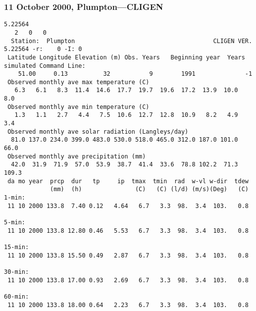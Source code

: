 \subsubsection{11 October 2000, Plumpton---CLIGEN}
\label{sec:PlumptonTemporalScaleSimulationCLIGEN}
\begin{verbatim}
5.22564
   2   0   0
  Station:  Plumpton                                       CLIGEN VER. 5.22564 -r:    0 -I: 0
 Latitude Longitude Elevation (m) Obs. Years   Beginning year  Years simulated Command Line:
    51.00     0.13          32           9        1991              -1
 Observed monthly ave max temperature (C)
   6.3   6.1   8.3  11.4  14.6  17.7  19.7  19.6  17.2  13.9  10.0   8.0
 Observed monthly ave min temperature (C)
   1.3   1.1   2.7   4.4   7.5  10.6  12.7  12.8  10.9   8.2   4.9   3.4
 Observed monthly ave solar radiation (Langleys/day)
  81.0 137.0 234.0 399.0 483.0 530.0 518.0 465.0 312.0 187.0 101.0  66.0
 Observed monthly ave precipitation (mm)
  42.0  31.9  71.9  57.0  53.9  38.7  41.4  33.6  78.8 102.2  71.3 109.3
 da mo year  prcp  dur   tp     ip  tmax  tmin  rad  w-vl w-dir  tdew
             (mm)  (h)               (C)   (C) (l/d) (m/s)(Deg)   (C)
1-min:
 11 10 2000 133.8  7.40 0.12   4.64   6.7   3.3  98.  3.4  103.   0.8

5-min:
 11 10 2000 133.8 12.80 0.46   5.53   6.7   3.3  98.  3.4  103.   0.8

15-min:
 11 10 2000 133.8 15.50 0.49   2.87   6.7   3.3  98.  3.4  103.   0.8

30-min:
 11 10 2000 133.8 17.00 0.93   2.69   6.7   3.3  98.  3.4  103.   0.8

60-min:
 11 10 2000 133.8 18.00 0.64   2.23   6.7   3.3  98.  3.4  103.   0.8
\end{verbatim}

